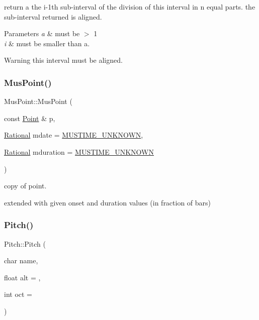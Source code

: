 return a the i-\/1th sub-\/interval of the division of this interval in n equal parts. the sub-\/interval returned is aligned. 


\begin{DoxyParams}{Parameters}
{\em a} & must be $>$ 1 \\
\hline
{\em i} & must be smaller than a. \\
\hline
\end{DoxyParams}
\begin{DoxyWarning}{Warning}
this interval must be aligned. 
\end{DoxyWarning}
\mbox{\label{group__segment_ga1bb17bef698401de18bc814c7f965999}} 
\subsubsection{\texorpdfstring{MusPoint()}{MusPoint()}}
{\footnotesize\ttfamily Mus\+Point\+::\+Mus\+Point (\begin{DoxyParamCaption}\item[{const \mbox{\hyperlink{classPoint}{Point}} \&}]{p,  }\item[{\mbox{\hyperlink{classRational}{Rational}}}]{mdate = {\ttfamily \mbox{\hyperlink{group__general_gae862a9d955eb3154601efb64980ac24b}{M\+U\+S\+T\+I\+M\+E\+\_\+\+U\+N\+K\+N\+O\+WN}}},  }\item[{\mbox{\hyperlink{classRational}{Rational}}}]{mduration = {\ttfamily \mbox{\hyperlink{group__general_gae862a9d955eb3154601efb64980ac24b}{M\+U\+S\+T\+I\+M\+E\+\_\+\+U\+N\+K\+N\+O\+WN}}} }\end{DoxyParamCaption})}



copy of point. 

extended with given onset and duration values (in fraction of bars) \mbox{\label{group__segment_gaf3f9d88915bb6688d522f09d7542f690}} 
\subsubsection{\texorpdfstring{Pitch()}{Pitch()}\hspace{0.1cm}{\footnotesize\ttfamily [1/2]}}
{\footnotesize\ttfamily Pitch\+::\+Pitch (\begin{DoxyParamCaption}\item[{char}]{name,  }\item[{float}]{alt = {},  }\item[{int}]{oct = {} }\end{DoxyParamCaption})}



